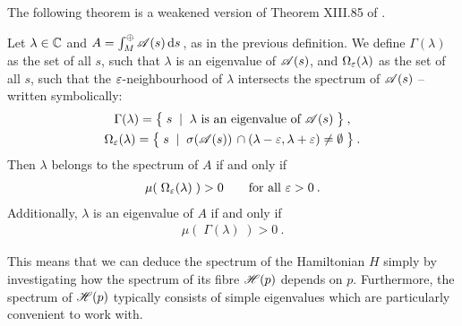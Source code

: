 The following theorem is a weakened version of Theorem XIII.85 of \cite{ReedSimon4}.

\begin{thm}
    \label{thm-direct-integral-spectrum}
    Let $\lambda \in \mathbb{C}$ and $A = \int^\oplus_M \mathscr{A}(s) \, \mathrm{d}s \,$, as in the previous definition. We define $\Gamma(\lambda)$ as the set of all $s$, such that $\lambda$ is an eigenvalue of $\mathscr{A}(s)$, and $\Omega_\varepsilon(\lambda)$ as the set of all $s$, such that the $\varepsilon$-neighbourhood of $\lambda$ intersects the spectrum of $\mathscr{A}(s)$ – written symbolically:
    \begin{gather*}
        \Gamma(\lambda)
        = \big\{\; s \;\;|\;\; \lambda \text{ is an eigenvalue of } \mathscr{A}(s) \;\big\} \: ,
        \\
        \Omega_\varepsilon(\lambda)
        = \big\{\; s \;\;|\;\; \sigma(\mathscr{A}(s)) \, \cap (\lambda - \varepsilon, \lambda + \varepsilon) \neq \emptyset \;\big\} \: .
    \end{gather*}
    Then $\lambda$ belongs to the spectrum of $A$ if and only if
    \begin{gather*}
        \mu(\; \Omega_\varepsilon(\lambda) \;) > 0
        \qquad \text{for all } \varepsilon > 0 \: .
    \end{gather*}
    Additionally, $\lambda$ is an eigenvalue of $A$ if and only if
    \begin{gather*}
        \mu(\; \Gamma(\lambda) \;) > 0 \: .
    \end{gather*}
\end{thm}

This means that we can deduce the spectrum of the Hamiltonian $H$ simply by investigating how the spectrum of its fibre $\mathscr{H}(p)$ depends on $p$. Furthermore, the spectrum of $\mathscr{H}(p)$ typically consists of simple eigenvalues which are particularly convenient to work with.

